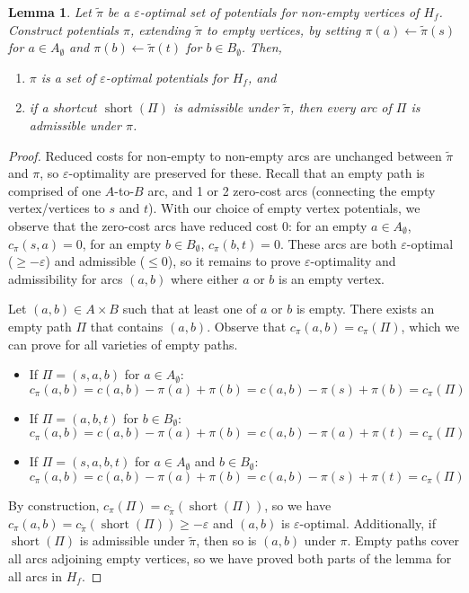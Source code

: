 \documentclass[11pt]{article}
\def\eps{\varepsilon}
\def\short{\operatorname{short}}
\theoremstyle{plain}
\newtheorem{lemma}{Lemma}[section]
\numberwithin{figure}{section}
\begin{document}
\begin{lemma}
\label{lemma:empty_correct}
Let $\tilde{\pi}$ be a $\eps$-optimal set of potentials for non-empty
vertices of $H_f$.
Construct potentials $\pi$, extending $\tilde{\pi}$ to empty vertices, by
setting $\pi(a) \gets \tilde{\pi}(s)$ for $a \in A_\emptyset$ and
$\pi(b) \gets \tilde{\pi}(t)$ for $b \in B_\emptyset$.
Then,
\begin{enumerate}
\item $\pi$ is a set of $\eps$-optimal potentials for $H_f$, and
\item if a shortcut $\short(\Pi)$ is admissible under $\tilde{\pi}$,
	then every arc of $\Pi$ is admissible under $\pi$.
\end{enumerate}
\end{lemma}

\begin{proof}
Reduced costs for non-empty to non-empty arcs are unchanged between
$\tilde{\pi}$ and $\pi$, so $\eps$-optimality are preserved for these.
Recall that an empty path is comprised of one $A$-to-$B$ arc, and 1 or 2
zero-cost arcs (connecting the empty vertex/vertices to $s$ and $t$).
With our choice of empty vertex potentials, we observe that the zero-cost arcs
have reduced cost 0:
for an empty $a \in A_\emptyset$, $c_\pi(s, a) = 0$, for an empty
$b \in B_\emptyset$, $c_\pi(b, t) = 0$.
These arcs are both $\eps$-optimal ($\geq -\eps$) and admissible ($\leq 0$), so
it remains to prove $\eps$-optimality and admissibility for arcs $(a, b)$ where
either $a$ or $b$ is an empty vertex.

Let $(a, b) \in A \times B$ such that at least one of $a$ or $b$ is empty.
There exists an empty path $\Pi$ that contains $(a, b)$.
Observe that $c_\pi(a, b) = c_\pi(\Pi)$,
which we can prove for all varieties of empty paths.
\begin{itemize}
\item If $\Pi = (s, a, b)$ for $a \in A_\emptyset$:
	\begin{equation*}
	c_\pi(a, b) = c(a, b) - \pi(a) + \pi(b) = c(a, b) - \pi(s) + \pi(b) = c_\pi(\Pi)
	\end{equation*}
\item If $\Pi = (a, b, t)$ for $b \in B_\emptyset$:
	\begin{equation*}
	c_\pi(a, b) = c(a, b) - \pi(a) + \pi(b) = c(a, b) - \pi(a) + \pi(t) = c_\pi(\Pi)
	\end{equation*}
\item If $\Pi = (s, a, b, t)$ for $a \in A_\emptyset$ and $b \in B_\emptyset$:
	\begin{equation*}
	c_\pi(a, b) = c(a, b) - \pi(a) + \pi(b) = c(a, b) - \pi(s) + \pi(t) = c_\pi(\Pi)
	\end{equation*}
\end{itemize}
By construction, $c_\pi(\Pi) = c_{\tilde{\pi}}(\short(\Pi))$, so we have
$c_\pi(a, b) = c_{\tilde{\pi}}(\short(\Pi)) \geq -\eps$ and $(a, b)$ is
$\eps$-optimal.
Additionally, if $\short(\Pi)$ is admissible under $\tilde{\pi}$, then so is
$(a, b)$ under $\pi$.
Empty paths cover all arcs adjoining empty vertices, so we have proved both
parts of the lemma for all arcs in $H_f$.
\end{proof}
\end{document}
